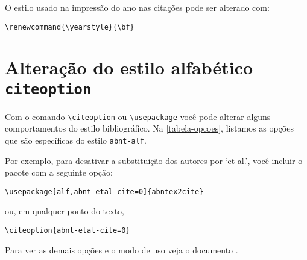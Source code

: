 \documentclass[a4paper]{ltxdoc}
\begin{document}
\DescribeMacro{\yearstyle}
O estilo usado na impressão do ano nas citações pode ser
alterado com:

\begin{verbatim}
\renewcommand{\yearstyle}{\bf}
\end{verbatim}

\section{Alteração do estilo alfabético {\tt citeoption}}

\DescribeMacro{\citeoption}
Com o comando \verb+\citeoption+ ou \verb+\usepackage+ você pode alterar alguns comportamentos
do estilo bibliográfico. Na \autoref{tabela-opcoes}, listamos as opções que são
específicas do estilo {\tt abnt-alf}.

Por exemplo, para desativar a substituição dos autores por `et al.', você
incluir o pacote com a seguinte opção:

\begin{verbatim}
\usepackage[alf,abnt-etal-cite=0]{abntex2cite}
\end{verbatim}

ou, em qualquer ponto do texto,

\begin{verbatim}
\citeoption{abnt-etal-cite=0}
\end{verbatim}

Para ver as demais opções e o modo de uso veja o
documento \cite{abntex2cite}.
\end{document}
